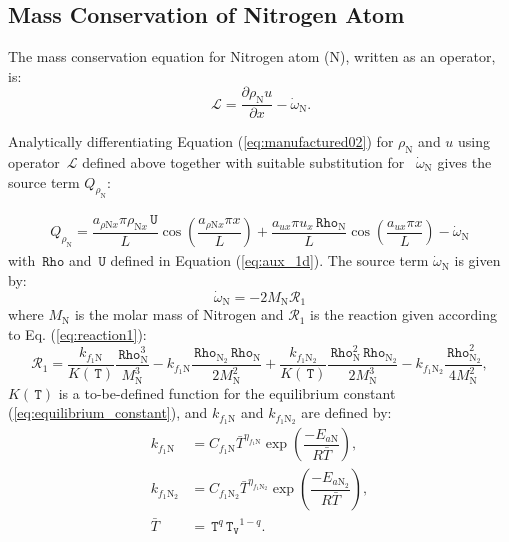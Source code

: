 \documentclass[10pt]{article}
\newcommand{\diff}[2] {\dfrac{\partial #1 }{\partial #2}}
\newcommand{\Lo}{\,\mathcal{L}}
\newcommand{\Rho}{\,\mathtt{Rho}}
\newcommand{\T}{\,\mathtt{T}}
\newcommand{\U}{\,\mathtt{U}}
\newcommand{\TV}{\,\mathtt{T_V}}
\newcommand{\N}{\text{N}}
\begin{document}



\subsection{Mass Conservation of Nitrogen Atom}

The mass conservation equation for Nitrogen atom (N), written as an operator, is:
\begin{equation*}
 \label{eq:euler1d_11}
\Lo =  \diff{\rho_\text{N} u}{x} - \dot{\omega}_{\text{N}}.
\end{equation*}

Analytically differentiating Equation (\ref{eq:manufactured02}) for $\rho_{\text{N}}$  and $u$ using operator $\Lo$ defined above together with suitable substitution for ~$\dot{\omega}_\text{N}$ gives the source term $Q_{\rho_{\text{N}}}$:



\begin{equation}
\begin{split}
Q_{\rho_\N} = \dfrac{a_{  \rho \N x } \pi \rho_{\N x} \U }{L}\cos\left(\dfrac{a_{  \rho \N x } \pi x}{L}\right) +\dfrac{a_{ux} \pi u_x \Rho_{\N}}{L} \cos\left(\dfrac{a_{ux} \pi x}{L}\right) -\dot{\omega}_\N
\end{split}
\end{equation}
%
with $\Rho$ and $\U$ defined in Equation (\ref{eq:aux_1d}). The source term $\dot{\omega}_\N$ is given by:
$$
\dot{\omega}_\N = -2 M_\N \mathcal{R}_1	
$$
where $M_{\text{N}}$ is the molar mass of Nitrogen and $\mathcal{R}_1$ is the reaction given according to Eq. (\ref{eq:reaction1}):
\begin{equation}\label{eq:reaction3}
\mathcal{R}_1= \dfrac{k_{f_1 \N}}{K(\T)} \dfrac{\Rho_{\N}^3}{M_\N^3} - k_{f_1 \N}   \dfrac{\Rho_{\N_2} \Rho_{\N}}{2  M_\N^2}+
\dfrac{k_{f_1 \N_2}}{K(\T)} \dfrac{\Rho_\N^2 \Rho_{\N_2}}{2M_\N^3 }- k_{f_1 \N_2} \dfrac{\Rho_{\N_2}^2}{4 M_\N^2},
\end{equation}
$K(\T)$ is a to-be-defined function for the equilibrium constant (\ref{eq:equilibrium_constant}), and $k_{f_1 \text{N}}$ and $k_{f_1 \text{N}_2}$ are defined by:
\begin{equation}
 \begin{split}\label{eq:forward_rates}
k_{f_1 \text{N}} &= C_{f_1 \text{N}} \bar{T}^{\eta_{f_1 \text{N}}} \exp\left(\dfrac{-E_{a\text{N}}}{R \bar{T}}\right),\\
k_{f_1 \text{N}_2} &= C_{f_1 \text{N}_2} \bar{T}^{\eta_{f_1 \text{N}_2}} \exp\left(\dfrac{-E_{a\text{N}_2}}{R \bar{T}}\right),\\
\bar{T}&=\T^q \TV^{1-q}.
 \end{split}
\end{equation}
\end{document}
